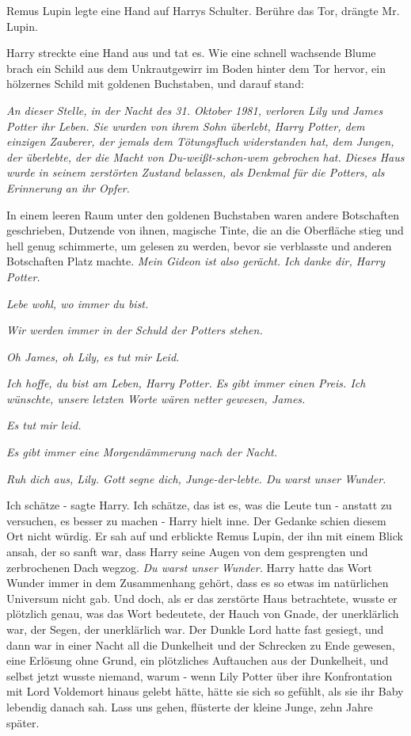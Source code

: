 Remus Lupin legte eine Hand auf Harrys Schulter. \glqq{}Berühre das Tor\grqq{},
drängte Mr. Lupin.

Harry streckte eine Hand aus und tat es. Wie eine schnell wachsende Blume brach
ein Schild aus dem Unkrautgewirr im Boden hinter dem Tor hervor, ein hölzernes
Schild mit goldenen Buchstaben, und darauf stand:

\emph{An dieser Stelle, in der Nacht des 31. Oktober 1981, verloren Lily und
James Potter ihr Leben. Sie wurden von ihrem Sohn überlebt, Harry Potter, dem
einzigen Zauberer, der jemals dem Tötungsfluch widerstanden hat, dem Jungen, der
überlebte, der die Macht von Du-weißt-schon-wem gebrochen hat.} \emph{Dieses
Haus wurde in seinem zerstörten Zustand belassen, als Denkmal für die Potters,
als Erinnerung an ihr Opfer.}

In einem leeren Raum unter den goldenen Buchstaben waren andere Botschaften
geschrieben, Dutzende von ihnen, magische Tinte, die an die Oberfläche stieg und
hell genug schimmerte, um gelesen zu werden, bevor sie verblasste und anderen
Botschaften Platz machte.
\emph{Mein Gideon ist also gerächt. Ich danke dir, Harry Potter.}

\emph{Lebe wohl, wo immer du bist.}

\emph{Wir werden immer in der Schuld der Potters stehen.}

\emph{Oh James, oh Lily, es tut mir Leid.}

\emph{Ich hoffe, du bist am Leben, Harry Potter.} \emph{Es gibt immer einen
Preis. Ich wünschte, unsere letzten Worte wären netter gewesen, James.}

\emph{Es tut mir leid.}

\emph{Es gibt immer eine Morgendämmerung nach der Nacht.}

\emph{Ruh dich aus, Lily. Gott segne dich, Junge-der-lebte. Du warst unser
Wunder.}

\glqq{}Ich schätze -\grqq{} sagte Harry. \glqq{}Ich schätze, das ist es, was die
Leute tun - anstatt zu versuchen, es besser zu machen -\grqq{} Harry hielt inne.
Der Gedanke schien diesem Ort nicht würdig. Er sah auf und erblickte Remus
Lupin, der ihn mit einem Blick ansah, der so sanft war, dass Harry seine Augen
von dem gesprengten und zerbrochenen Dach wegzog. \emph{Du warst unser Wunder.}
Harry hatte das Wort \glqq{}Wunder\grqq{} immer in dem Zusammenhang gehört, dass
es so etwas im natürlichen Universum nicht gab. Und doch, als er das zerstörte
Haus betrachtete, wusste er plötzlich genau, was das Wort bedeutete, der Hauch
von Gnade, der unerklärlich war, der Segen, der unerklärlich war. Der Dunkle
Lord hatte fast gesiegt, und dann war in einer Nacht all die Dunkelheit und der
Schrecken zu Ende gewesen, eine Erlösung ohne Grund, ein plötzliches Auftauchen
aus der Dunkelheit, und selbst jetzt wusste niemand, warum - wenn Lily Potter
über ihre Konfrontation mit Lord Voldemort hinaus gelebt hätte, hätte sie sich
so gefühlt, als sie ihr Baby lebendig danach sah. \glqq{}Lass uns gehen\grqq{},
flüsterte der kleine Junge, zehn Jahre später.

